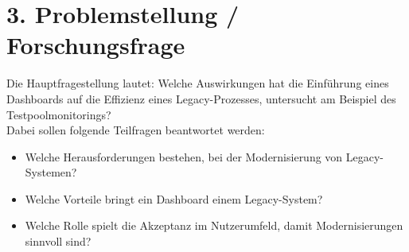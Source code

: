 
\section*{3. Problemstellung / Forschungsfrage}
Die Hauptfragestellung lautet: Welche Auswirkungen hat die Einführung eines Dashboards auf die Effizienz eines Legacy-Prozesses, untersucht am Beispiel des Testpoolmonitorings? \\
Dabei sollen folgende Teilfragen beantwortet werden:
\begin{itemize}
    \item Welche Herausforderungen bestehen, bei der Modernisierung von Legacy-Systemen?
    \item Welche Vorteile bringt ein Dashboard einem Legacy-System?
    \item Welche Rolle spielt die Akzeptanz im Nutzerumfeld, damit Modernisierungen sinnvoll sind?
\end{itemize}

